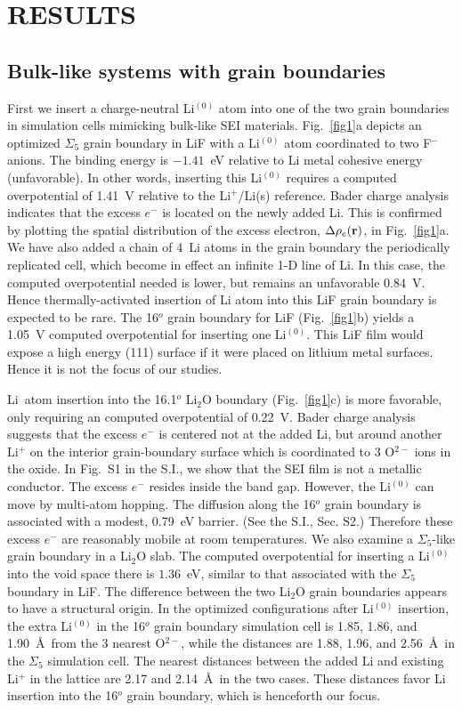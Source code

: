 \documentclass[prb,preprint,amsmath,amssymb]{revtex4}
\begin{document}
\section*{RESULTS}
\subsection*{Bulk-like systems with grain boundaries}

First we insert a charge-neutral Li$^{(0)}$ atom into one of the two grain
boundaries in simulation cells mimicking bulk-like SEI materials.
Fig.~\ref{fig1}a depicts an optimized $\Sigma_5$ grain boundary in LiF with
a Li$^{(0)}$ atom coordinated to two F$^-$ anions.  The binding energy is
$-1.41$~eV relative to Li metal cohesive energy (unfavorable).  In other words,
inserting this Li$^{(0)}$ requires a computed overpotential of 1.41~V relative
to the Li$^+$/Li(s) reference.  Bader charge analysis indicates that the
excess $e^-$ is located on the newly added Li. This is confirmed by plotting
the spatial distribution of the excess electron, $\Delta \rho_e({\bf r})$,
in Fig.~\ref{fig1}a.  We have also added a chain of 4~Li atoms in the grain
boundary the periodically replicated cell, which become in effect an infinite
1-D line of Li.  In this case, the computed overpotential needed is lower,
but remains an unfavorable $0.84$~V. Hence thermally-activated insertion of
Li atom into this LiF grain boundary is expected to be rare.  The 16$^o$
grain boundary for LiF (Fig.~\ref{fig1}b) yields a 1.05~V computed
overpotential for inserting one Li$^{(0)}$.  This LiF film would expose a
high energy (111) surface if it were placed on lithium metal surfaces.  Hence
it is not the focus of our studies.

Li~atom insertion into the 16.1$^o$ Li$_2$O boundary (Fig.~\ref{fig1}c) is more
favorable, only requiring an computed overpotential of 0.22~V.  Bader charge
analysis suggests that the excess $e^-$ is centered not at the added Li,
but around another Li$^+$ on the interior grain-boundary surface which is
coordinated to 3 O$^{2-}$ ions in the oxide.  In Fig.~S1 in the S.I., we show
that the SEI film is not a metallic conductor.  The excess $e^-$ resides
inside the band gap.  However, the Li$^{(0)}$ can move by multi-atom hopping.
The diffusion along the 16$^o$ grain boundary is associated with a modest,
0.79~eV barrier.  (See the S.I., Sec. S2.)  Therefore these excess $e^-$ are
reasonably mobile at room temperatures.  We also examine a $\Sigma_5$-like
grain boundary in a Li$_2$O slab.  The computed overpotential for inserting
a Li$^{(0)}$ into the void space there is $1.36$~eV, similar to that associated
with the $\Sigma_5$ boundary in LiF.  The difference between the two Li$_2$O
grain boundaries appears to have a structural origin.
In the optimized configurations after Li$^{(0)}$
insertion, the extra Li$^{(0)}$ in the 16$^o$ grain boundary simulation
cell is 1.85, 1.86, and 1.90~\AA\, from the 3 nearest O$^{2-}$, while the
distances are 1.88, 1.96, and 2.56~\AA\, in the $\Sigma_5$ simulation cell. 
The nearest distances between the added Li and existing Li$^+$ in the lattice
are 2.17 and 2.14~\AA\, in the two cases.  These distances favor Li insertion
into the 16$^o$ grain boundary, which is henceforth our focus.
\end{document}
